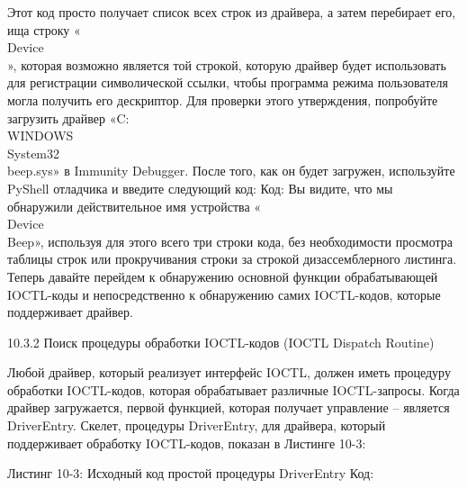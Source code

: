 \documentclass[12pt]{book}
\begin{document}
Этот код просто получает список всех строк из драйвера, а затем перебирает его, ища строку «\\Device\\», которая возможно является той строкой, которую драйвер будет использовать для регистрации символической ссылки, чтобы программа режима пользователя могла получить его дескриптор. Для проверки этого утверждения, попробуйте загрузить драйвер «C:\\WINDOWS\\System32\\beep.sys» в Immunity Debugger. После того, как он будет загружен, используйте PyShell отладчика и введите следующий код:
Код:
Вы видите, что мы обнаружили действительное имя устройства «\\Device\\Beep», используя для этого всего три строки кода, без необходимости просмотра таблицы строк или прокручивания строки за строкой дизассемблерного листинга. Теперь давайте перейдем к обнаружению основной функции обрабатывающей IOCTL-коды и непосредственно к обнаружению самих IOCTL-кодов, которые поддерживает драйвер. 

10.3.2 Поиск процедуры обработки IOCTL-кодов (IOCTL Dispatch Routine)

Любой драйвер, который реализует интерфейс IOCTL, должен иметь процедуру обработки IOCTL-кодов, которая обрабатывает различные IOCTL-запросы. Когда драйвер загружается, первой функцией, которая получает управление – является DriverEntry. Скелет, процедуры DriverEntry, для драйвера, который поддерживает обработку IOCTL-кодов, показан в Листинге 10-3:

Листинг 10-3: Исходный код простой процедуры DriverEntry
Код:

\end{document}
